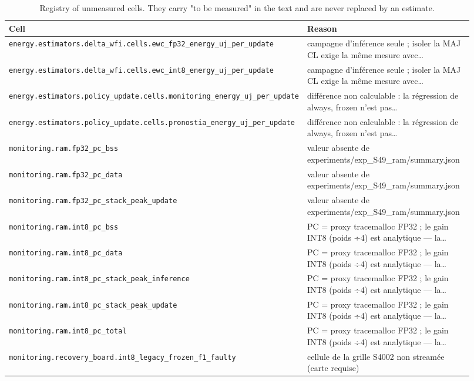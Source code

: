 \begin{table}[htbp]
\centering
\caption{Registry of unmeasured cells. They carry "to be measured" in the text and are never replaced by an estimate.}
\label{tab:annex-missing}
\begin{tabular}{p{0.42\linewidth}p{0.5\linewidth}}
\toprule
Cell & Reason \\
\midrule
\texttt{energy.estimators.delta\_wfi.cells.ewc\_fp32\_energy\_uj\_per\_update} & campagne d'inférence seule ; isoler la MAJ CL exige la même mesure avec… \\
\texttt{energy.estimators.delta\_wfi.cells.ewc\_int8\_energy\_uj\_per\_update} & campagne d'inférence seule ; isoler la MAJ CL exige la même mesure avec… \\
\texttt{energy.estimators.policy\_update.cells.monitoring\_energy\_uj\_per\_update} & différence non calculable : la régression de always, frozen n'est pas… \\
\texttt{energy.estimators.policy\_update.cells.pronostia\_energy\_uj\_per\_update} & différence non calculable : la régression de always, frozen n'est pas… \\
\texttt{monitoring.ram.fp32\_pc\_bss} & valeur absente de experiments/exp\_S49\_ram/summary.json \\
\texttt{monitoring.ram.fp32\_pc\_data} & valeur absente de experiments/exp\_S49\_ram/summary.json \\
\texttt{monitoring.ram.fp32\_pc\_stack\_peak\_update} & valeur absente de experiments/exp\_S49\_ram/summary.json \\
\texttt{monitoring.ram.int8\_pc\_bss} & PC = proxy tracemalloc FP32 ; le gain INT8 (poids ÷4) est analytique — la… \\
\texttt{monitoring.ram.int8\_pc\_data} & PC = proxy tracemalloc FP32 ; le gain INT8 (poids ÷4) est analytique — la… \\
\texttt{monitoring.ram.int8\_pc\_stack\_peak\_inference} & PC = proxy tracemalloc FP32 ; le gain INT8 (poids ÷4) est analytique — la… \\
\texttt{monitoring.ram.int8\_pc\_stack\_peak\_update} & PC = proxy tracemalloc FP32 ; le gain INT8 (poids ÷4) est analytique — la… \\
\texttt{monitoring.ram.int8\_pc\_total} & PC = proxy tracemalloc FP32 ; le gain INT8 (poids ÷4) est analytique — la… \\
\texttt{monitoring.recovery\_board.int8\_legacy\_frozen\_f1\_faulty} & cellule de la grille S4002 non streamée (carte requise) \\

\end{tabular}
\end{table}
